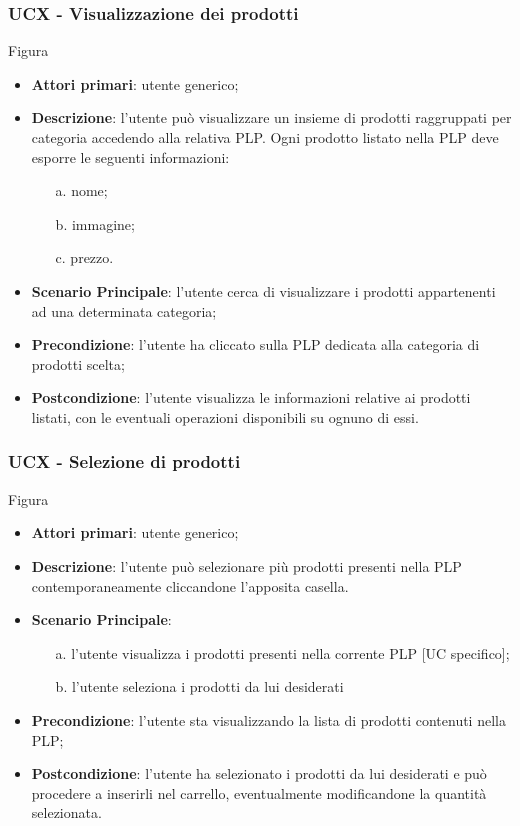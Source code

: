 \subsubsection{UCX - Visualizzazione dei prodotti}
Figura \\
\begin{itemize}
\item \textbf{Attori primari}: utente generico;
\item \textbf{Descrizione}: l'utente può visualizzare un insieme di prodotti raggruppati per categoria accedendo alla relativa PLP. Ogni prodotto listato nella PLP deve esporre le seguenti informazioni:
\begin{enumerate}
\item[a.] nome;
\item[b.] immagine;
\item[c.] prezzo.
\end{enumerate}
\item \textbf{Scenario Principale}: l'utente cerca di visualizzare i prodotti appartenenti ad una determinata categoria;
\item \textbf{Precondizione}: l'utente ha cliccato sulla PLP dedicata alla categoria di prodotti scelta;
\item \textbf{Postcondizione}: l'utente visualizza le informazioni relative ai prodotti listati, con le eventuali operazioni disponibili su ognuno di essi.
\end{itemize}
\subsubsection{UCX - Selezione di prodotti}
Figura \\
\begin{itemize}
\item \textbf{Attori primari}: utente generico;
\item \textbf{Descrizione}: l'utente può selezionare più prodotti presenti nella PLP contemporaneamente cliccandone l'apposita casella.
\item \textbf{Scenario Principale}:
\begin{enumerate}
\item[a.] l'utente visualizza i prodotti presenti nella corrente PLP [UC specifico];
\item[b.] l'utente seleziona i prodotti da lui desiderati
\end{enumerate}
\item \textbf{Precondizione}: l'utente sta visualizzando la lista di prodotti contenuti nella PLP;
\item \textbf{Postcondizione}: l'utente ha selezionato i prodotti da lui desiderati e può procedere a inserirli nel carrello, eventualmente modificandone la quantità selezionata.
\end{itemize}
